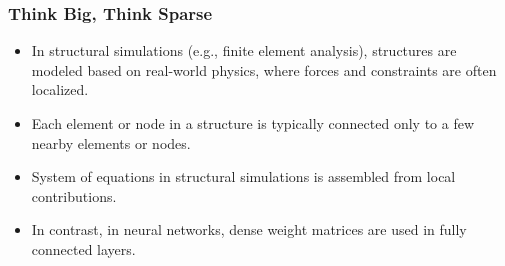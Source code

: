 \documentclass[t,12pt,numbers,fleqn]{beamer}
\begin{document}

\begin{frame}
\frametitle{Think Big, Think Sparse}

\begin{itemize}
\item In structural simulations (e.g., finite element analysis), structures are
  modeled based on real-world physics, where forces and constraints are often
  localized.
\item Each element or node in a structure is typically connected only to a few
  nearby elements or nodes.
\item System of equations in structural simulations is assembled from local
  contributions.
\item In contrast, in neural networks, dense weight matrices are used in fully
  connected layers.
\end{itemize}

\end{frame}

\end{document}

